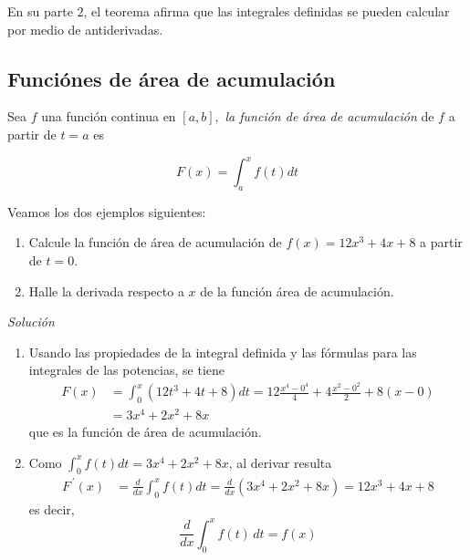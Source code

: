 En su parte $2$, el teorema
afirma que las integrales definidas se pueden calcular por medio
de antiderivadas.

\subsection*{Funciónes de área de acumulación}

Sea $f $ una función continua en $\left[ a,b\right] ,$ \textit{la
función de área de acumulación} de $f$ a partir de $t=a$ es

\[
F\left( x\right) =\int_{a}^{x}f(t)dt
\]

\begin{ejemplo} \textnormal{Veamos los dos ejemplos siguientes:}

\begin{enumerate}[leftmargin=1.2em,   itemindent=0pt,       labelwidth=\labelwidth,labelsep=0.5em,]

\item \textnormal{Calcule la función de área de acumulación de \textit{$f\left(
x\right) =12x^{3}+4x+8$} a partir de \textit{$t=0.$}}

\item \textnormal{Halle la derivada respecto a \textit{$x$} de la función área de acumulación.}
\end{enumerate}


\end{ejemplo}
\textit{Solución}
\begin{enumerate}[leftmargin=1.2em,   itemindent=0pt,       labelwidth=\labelwidth,labelsep=0.5em,]


	
\item
Usando las propiedades de la integral definida y las fórmulas para las integrales de las potencias, se tiene
\begin{align*}
F\left( x\right) &=\int_{0}^{x}(12t^{3}+4t+8)dt=12\frac{x^{4}-0^{4}}{4}+4%
\frac{x^{2}-0^{2}}{2}+8\left( x-0\right)\\& =3x^{4}+2x^{2}+8x
\end{align*}
que es la función de área de acumulación.

\item
Como $\displaystyle\int_{0}^{x}f(t)dt=3x^{4}+2x^{2}+8x$, al derivar resulta
\begin{align*}
F^{\,\prime}\left( x\right) &=\frac{d}{dx}\int_{0}^{x}f(t)dt%
=\frac{d}{dx}\left(3x^{4}+2x^{2}+8x\right) =12x^{3}+4x+8
\end{align*}
es decir,
\[
\frac{d}{dx} \int_{0}^{x} f(t)\,dt = f(x)
\]
\end{enumerate}


